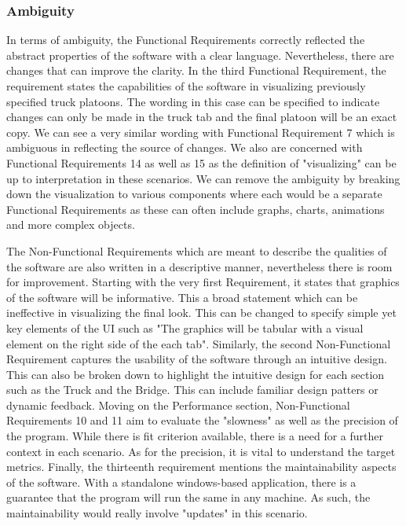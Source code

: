 \documentclass[12pt, titlepage]{article}
\begin{document}
\subsubsection{Ambiguity}
In terms of ambiguity, the Functional Requirements correctly reflected the abstract properties of the software with a clear language. Nevertheless, there are changes that can improve the clarity. In the third Functional Requirement, the requirement states the capabilities of the software in visualizing previously specified truck platoons. The wording in this case can be specified to indicate changes can only be made in the truck tab and the final platoon will be an exact copy. We can see a very similar wording with Functional Requirement 7 which is ambiguous in reflecting the source of changes. We also are concerned with Functional Requirements 14 as well as 15 as the definition of "visualizing" can be up to interpretation in these scenarios. We can remove the ambiguity by breaking down the visualization to various components where each would be a separate Functional Requirements as these can often include graphs, charts, animations and more complex objects. 

The Non-Functional Requirements which are meant to describe the qualities of the software are also written in a descriptive manner, nevertheless there is room for improvement. Starting with the very first Requirement, it states that graphics of the software will be informative. This a broad statement which can be ineffective in visualizing the final look. This can be changed to specify simple yet key elements of the UI such as "The graphics will be tabular with a visual element on the right side of the each tab".  Similarly, the second Non-Functional Requirement captures the usability of the software through an intuitive design. This can also be broken down to highlight the intuitive design for each section such as the Truck and the Bridge. This can include familiar design patters or dynamic feedback. Moving on the Performance section, Non-Functional Requirements 10 and 11 aim to evaluate the "slowness" as well as the precision of the program. While there is fit criterion available, there is a need for a further context in each scenario. As for the precision, it is vital to understand the target metrics. Finally, the thirteenth requirement mentions the maintainability aspects of the software. With a standalone windows-based application, there is a guarantee that the program will run the same in any machine. As such, the maintainability would really involve "updates" in this scenario.
\end{document}

